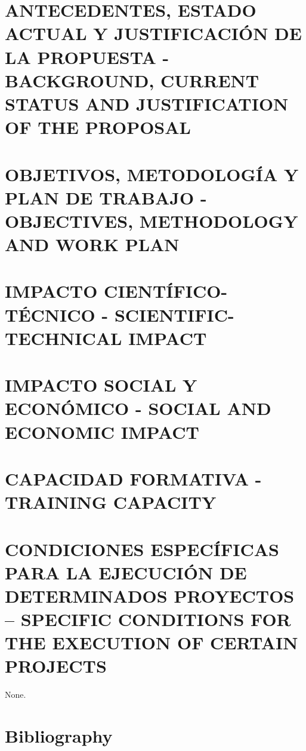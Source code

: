 \documentclass[a4paper,11pt,oneside, english]{article}
\begin{document}
\section{\small ANTECEDENTES, ESTADO ACTUAL Y JUSTIFICACIÓN DE LA PROPUESTA - BACKGROUND, CURRENT STATUS AND JUSTIFICATION OF THE PROPOSAL}
\label{sec.just}

\label{sec.proposal}






\section{\small  OBJETIVOS, METODOLOGÍA Y PLAN DE TRABAJO - OBJECTIVES, METHODOLOGY AND WORK PLAN}











\section{\small  IMPACTO CIENTÍFICO-TÉCNICO - SCIENTIFIC-TECHNICAL IMPACT}
\label{sec.impact}

\section{\small  IMPACTO SOCIAL Y ECONÓMICO - SOCIAL AND ECONOMIC IMPACT}
\label{sec.social}


\section{\small CAPACIDAD FORMATIVA - TRAINING CAPACITY}
\label{sec.training}

\section{\small  CONDICIONES ESPECÍFICAS PARA LA EJECUCIÓN DE DETERMINADOS PROYECTOS – SPECIFIC CONDITIONS FOR THE EXECUTION OF CERTAIN PROJECTS}
\label{sec.specs}
None.

\section{Bibliography}

%

\end{document}
